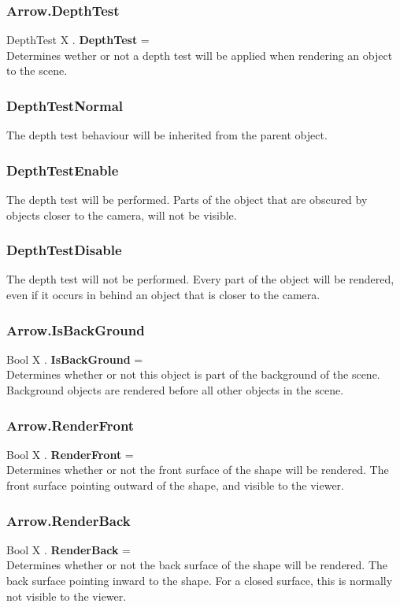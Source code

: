 \subsubsection{Arrow.DepthTest \label{F:Arrow:DepthTest}}
DepthTest X . \textbf{DepthTest} = \\
Determines wether or not a depth test will be applied when rendering an object to the scene.

\subsubsection{DepthTestNormal \label{T:DepthTest|DepthTestNormal}}
The depth test behaviour will be inherited from the parent object.

\subsubsection{DepthTestEnable \label{T:DepthTest|DepthTestEnable}}
The depth test will be performed. Parts of the object that are obscured by objects closer to the camera, will not be visible.

\subsubsection{DepthTestDisable \label{T:DepthTest|DepthTestDisable}}
The depth test will not be performed. Every part of the object will be rendered, even if it occurs in behind an object that is closer to the camera.

\subsubsection{Arrow.IsBackGround \label{F:Arrow:IsBackGround}}
Bool X . \textbf{IsBackGround} = \\
Determines whether or not this object is part of the background of the scene. Background objects are rendered before all other objects in the scene.

\subsubsection{Arrow.RenderFront \label{F:Arrow:RenderFront}}
Bool X . \textbf{RenderFront} = \\
Determines whether or not the front surface of the shape will be rendered. The front surface pointing outward of the shape, and visible to the viewer.

\subsubsection{Arrow.RenderBack \label{F:Arrow:RenderBack}}
Bool X . \textbf{RenderBack} = \\
Determines whether or not the back surface of the shape will be rendered. The back surface pointing inward to the shape. For a closed surface, this is normally not visible to the viewer.

